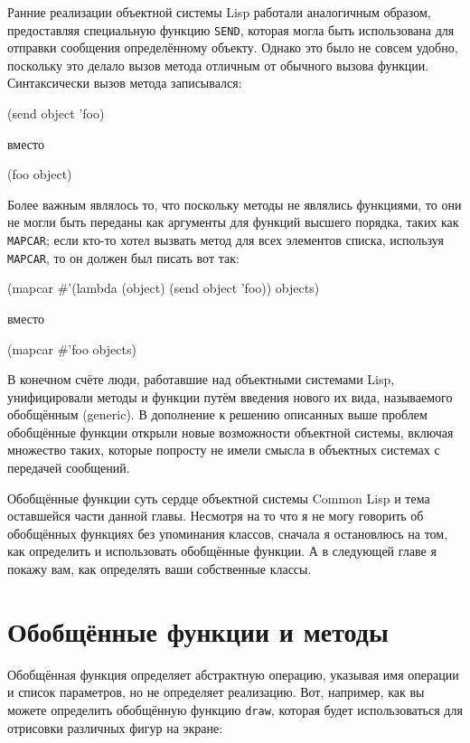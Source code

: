 Ранние реализации объектной системы Lisp работали аналогичным образом, предоставляя
специальную функцию \lstinline{SEND}, которая могла быть использована для отправки сообщения
определённому объекту.  Однако это было не совсем удобно, поскольку это делало вызов
метода отличным от обычного вызова функции.  Синтаксически вызов метода записывался:

\begin{myverb}
(send object 'foo)
\end{myverb}

\noindent{}вместо

\begin{myverb}
(foo object)
\end{myverb}

Более важным являлось то, что поскольку методы не являлись функциями, то они не могли быть
переданы как аргументы для функций высшего порядка, таких как \lstinline{MAPCAR}; если кто-то
хотел вызвать метод для всех элементов списка, используя \lstinline{MAPCAR}, то он должен был
писать вот так:

\begin{myverb}
(mapcar #'(lambda (object) (send object 'foo)) objects)
\end{myverb}

\noindent{}вместо

\begin{myverb}
(mapcar #'foo objects)
\end{myverb}

В конечном счёте люди, работавшие над объектными системами Lisp, унифицировали методы и
функции путём введения нового их вида, называемого обобщённым (generic).  В дополнение к
решению описанных выше проблем обобщённые функции открыли новые возможности объектной
системы, включая множество таких, которые попросту не имели смысла в объектных системах с
передачей сообщений.

Обобщённые функции суть сердце объектной системы Common Lisp и тема оставшейся части
данной главы.  Несмотря на то что я не могу говорить об обобщённых функциях без
упоминания классов, сначала я остановлюсь на том, как определить и использовать обобщённые
функции.  А в следующей главе я покажу вам, как определять ваши собственные классы.

\section{Обобщённые функции и методы}

Обобщённая функция определяет абстрактную операцию, указывая имя операции и список
параметров, но не определяет реализацию.  Вот, например, как вы можете определить
обобщённую функцию \lstinline{draw}, которая будет использоваться для отрисовки различных фигур
на экране:

